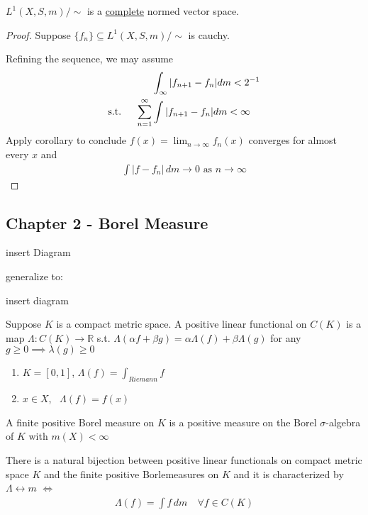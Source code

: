 \begin{corollary}
	$L^{1}(X,S, m) / \sim$ is a \underline{complete} normed vector space.
\end{corollary}

\begin{proof}
	Suppose $\{f_n\} \subseteq L^{1}(X,S, m) / \sim$ is cauchy.

	Refining the sequence, we may assume
	\begin{align*}
	&\int_{\infty}|f_{n+1} - f_{n} | dm < 2^{-1} \\ \text{s.t. \quad}
		\sum_{n=1}^{\infty} &\int | f_{n+1} - f_{n} | dm < \infty
	\end{align*}
	Apply corollary to conclude $f(x) = \lim_{n \to \infty} f_{n}(x)$ converges for almost every $x$ and
	\begin{align*}
		\int |f - f_{n} | \, dm \to 0 \text{ as } n \to \infty
	\end{align*}
\end{proof}


\subsection{Chapter 2 - Borel Measure}

insert Diagram


generalize to:

insert diagram

\begin{definition}
	Suppose $K$ is a compact metric space. A positive linear functional on $C(K)$ is a map $\Lambda : C(K) \to \mathbb{R}$ s.t.
	$\Lambda(\alpha f + \beta g) = \alpha \Lambda(f) + \beta\Lambda(g)$ for any
	$g \geq 0 \implies \lambda (g) \geq 0$
\end{definition}

\begin{example}
	\begin{enumerate}
		\item $K = [0,1]$, $\Lambda (f) = \int_{Riemann} f$
		\item $x \in X$, \, $\Lambda(f) = f(x)$
	\end{enumerate}
\end{example}

A finite positive Borel measure on $K$ is a positive measure on the Borel $\sigma$-algebra of $K$ with $m(X) < \infty$


\begin{theorem}
	There is a natural bijection between positive linear functionals on compact metric space $K$ and the finite positive Borlemeasures on $K$ and it is characterized by $\Lambda \leftrightarrow m$
	$\iff$
	 \begin{align*}
	\Lambda(f) = \int f \, dm \quad \forall f \in C(K)
	\end{align*}
\end{theorem}

